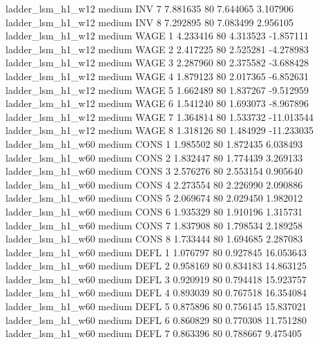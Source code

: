   ladder_lsm_h1_w12     medium      INV                 7  7.881635 80       7.644065           3.107906
  ladder_lsm_h1_w12     medium      INV                 8  7.292895 80       7.083499           2.956105
  ladder_lsm_h1_w12     medium     WAGE                 1  4.233416 80       4.313523          -1.857111
  ladder_lsm_h1_w12     medium     WAGE                 2  2.417225 80       2.525281          -4.278983
  ladder_lsm_h1_w12     medium     WAGE                 3  2.287960 80       2.375582          -3.688428
  ladder_lsm_h1_w12     medium     WAGE                 4  1.879123 80       2.017365          -6.852631
  ladder_lsm_h1_w12     medium     WAGE                 5  1.662489 80       1.837267          -9.512959
  ladder_lsm_h1_w12     medium     WAGE                 6  1.541240 80       1.693073          -8.967896
  ladder_lsm_h1_w12     medium     WAGE                 7  1.364814 80       1.533732         -11.013544
  ladder_lsm_h1_w12     medium     WAGE                 8  1.318126 80       1.484929         -11.233035
  ladder_lsm_h1_w60     medium     CONS                 1  1.985502 80       1.872435           6.038493
  ladder_lsm_h1_w60     medium     CONS                 2  1.832447 80       1.774439           3.269133
  ladder_lsm_h1_w60     medium     CONS                 3  2.576276 80       2.553154           0.905640
  ladder_lsm_h1_w60     medium     CONS                 4  2.273554 80       2.226990           2.090886
  ladder_lsm_h1_w60     medium     CONS                 5  2.069674 80       2.029450           1.982012
  ladder_lsm_h1_w60     medium     CONS                 6  1.935329 80       1.910196           1.315731
  ladder_lsm_h1_w60     medium     CONS                 7  1.837908 80       1.798534           2.189258
  ladder_lsm_h1_w60     medium     CONS                 8  1.733444 80       1.694685           2.287083
  ladder_lsm_h1_w60     medium     DEFL                 1  1.076797 80       0.927845          16.053643
  ladder_lsm_h1_w60     medium     DEFL                 2  0.958169 80       0.834183          14.863125
  ladder_lsm_h1_w60     medium     DEFL                 3  0.920919 80       0.794418          15.923757
  ladder_lsm_h1_w60     medium     DEFL                 4  0.893039 80       0.767518          16.354084
  ladder_lsm_h1_w60     medium     DEFL                 5  0.875896 80       0.756145          15.837021
  ladder_lsm_h1_w60     medium     DEFL                 6  0.860829 80       0.770308          11.751280
  ladder_lsm_h1_w60     medium     DEFL                 7  0.863396 80       0.788667           9.475405
